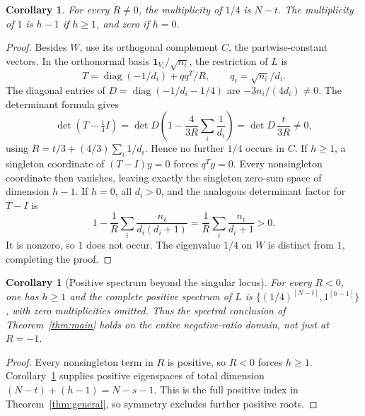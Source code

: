 \documentclass[11pt]{article}
\newtheorem{corollary}[theorem]{Corollary}
\newcommand{\diag}{\operatorname{diag}}
\newcommand{\one}{\mathbf{1}}
\begin{document}
\begin{corollary}\label{cor:multiplicities}
For every $R\ne0$, the multiplicity of $1/4$ is $N-t$.
The multiplicity of $1$ is $h-1$ if $h\ge1$, and zero if $h=0$.
\end{corollary}
\begin{proof}
Besides $W$, use its orthogonal complement $C$, the partwise-constant vectors.
In the orthonormal basis $\one_{V_i}/\sqrt{n_i}$, the restriction of $L$ is
\[
 T=\diag(-1/d_i)+qq^T/R,\qquad q_i=\sqrt{n_i}/d_i.
\]
The diagonal entries of $D=\diag(-1/d_i-1/4)$ are
$-3n_i/(4d_i)\ne0$. The determinant formula gives
\[
 \det(T-\tfrac14 I)=\det D\left(1-\frac4{3R}\sum_i\frac1{d_i}\right)
 =\det D\,\frac{t}{3R}\ne0,
\]
using $R=t/3+(4/3)\sum_i1/d_i$. Hence no further $1/4$ occurs in $C$.
If $h\ge1$, a singleton coordinate of $(T-I)y=0$ forces $q^Ty=0$.
Every nonsingleton coordinate then vanishes, leaving exactly the singleton
zero-sum space of dimension $h-1$.
If $h=0$, all $d_i>0$, and the analogous determinant factor for $T-I$ is
\[
 1-\frac1R\sum_i\frac{n_i}{d_i(d_i+1)}
 =\frac1R\sum_i\frac{n_i}{d_i+1}>0.
\]
It is nonzero, so $1$ does not occur. The eigenvalue $1/4$ on $W$ is distinct
from $1$, completing the proof.
\end{proof}

\begin{corollary}[Positive spectrum beyond the singular locus]\label{cor:negative-ratio}
For every $R<0$, one has $h\ge1$ and the complete positive spectrum of $L$
is $\{(1/4)^{[N-t]},1^{[h-1]}\}$, with zero multiplicities omitted.
Thus the spectral conclusion of Theorem~\ref{thm:main} holds on the
entire negative-ratio domain, not just at $R=-1$.
\end{corollary}
\begin{proof}
Every nonsingleton term in $R$ is positive, so $R<0$ forces $h\ge1$.
Corollary~\ref{cor:multiplicities} supplies positive eigenspaces of total
dimension $(N-t)+(h-1)=N-s-1$. This is the full positive index in
Theorem~\ref{thm:general}, so symmetry excludes further positive roots.
\end{proof}
\end{document}
